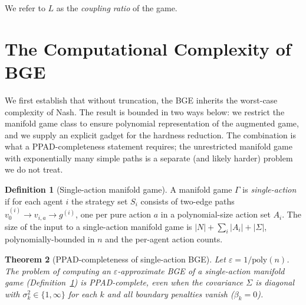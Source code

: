 \documentclass[11pt]{article}
\newtheorem{theorem}{Theorem}[section]
\theoremstyle{definition}
\newtheorem{definition}[theorem]{Definition}
\theoremstyle{remark}
\begin{document}
We refer to $L$ as the \emph{coupling ratio} of the game.


\section{The Computational Complexity of BGE}
\label{sec:complexity}

We first establish that without truncation, the BGE inherits the worst-case complexity of Nash. The
result is bounded in two ways below: we restrict the manifold game class to ensure polynomial
representation of the augmented game, and we supply an explicit gadget for the hardness reduction.
The combination is what a \textsc{PPAD}-completeness statement requires; the unrestricted manifold
game with exponentially many simple paths is a separate (and likely harder) problem we do not treat.

\begin{definition}[Single-action manifold game]
\label{def:single-action}
A manifold game $\Gamma$ is \emph{single-action} if for each agent $i$ the strategy set $S_i$
consists of two-edge paths $v_0^{(i)} \to v_{i,a} \to g^{(i)}$, one per pure action $a$ in a
polynomial-size action set $A_i$. The size of the input to a single-action manifold game is
$|N| + \sum_i |A_i| + |\Sigma|$, polynomially-bounded in $n$ and the per-agent action counts.
\end{definition}

\begin{theorem}[\textsc{PPAD}-completeness of single-action BGE]
\label{thm:bge-ppad}
Let $\varepsilon = 1/\mathrm{poly}(n)$. The problem of computing an $\varepsilon$-approximate BGE of a
single-action manifold game (Definition~\ref{def:single-action}) is \textsc{PPAD}-complete, even when
the covariance $\Sigma$ is diagonal with $\sigma_k^2 \in \{1, \infty\}$ for each $k$ and all boundary
penalties vanish ($\beta_k = 0$).
\end{theorem}
\end{document}
